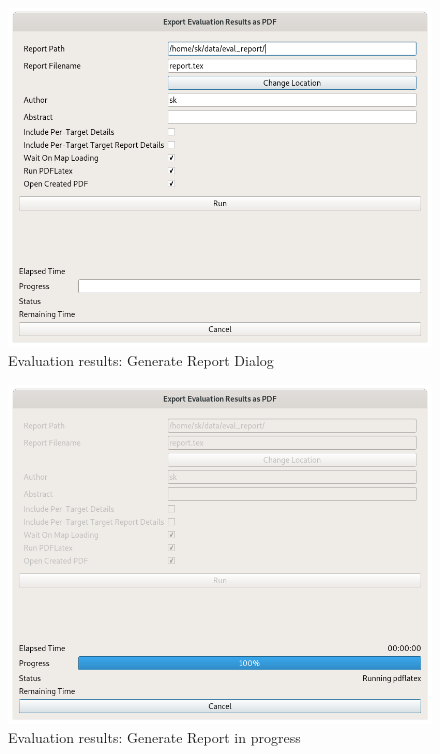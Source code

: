 \begin{figure}[H]
    \includegraphics[width=14cm,frame]{../screenshots/eval_report.png}
  \caption{Evaluation results: Generate Report Dialog}
\end{figure}

\begin{figure}[H]
    \includegraphics[width=14cm,frame]{../screenshots/eval_report_status.png}
  \caption{Evaluation results: Generate Report in progress}
\end{figure}

